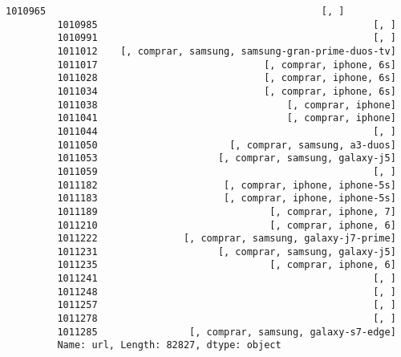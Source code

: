 \documentclass[11pt]{article}
\begin{document}
\begin{Verbatim}[commandchars=\\\{\}]
         1010965                                                [, ]
         1010985                                                [, ]
         1010991                                                [, ]
         1011012    [, comprar, samsung, samsung-gran-prime-duos-tv]
         1011017                             [, comprar, iphone, 6s]
         1011028                             [, comprar, iphone, 6s]
         1011034                             [, comprar, iphone, 6s]
         1011038                                 [, comprar, iphone]
         1011041                                 [, comprar, iphone]
         1011044                                                [, ]
         1011050                       [, comprar, samsung, a3-duos]
         1011053                     [, comprar, samsung, galaxy-j5]
         1011059                                                [, ]
         1011182                      [, comprar, iphone, iphone-5s]
         1011183                      [, comprar, iphone, iphone-5s]
         1011189                              [, comprar, iphone, 7]
         1011210                              [, comprar, iphone, 6]
         1011222               [, comprar, samsung, galaxy-j7-prime]
         1011231                     [, comprar, samsung, galaxy-j5]
         1011235                              [, comprar, iphone, 6]
         1011241                                                [, ]
         1011248                                                [, ]
         1011257                                                [, ]
         1011278                                                [, ]
         1011285                [, comprar, samsung, galaxy-s7-edge]
         Name: url, Length: 82827, dtype: object
\end{Verbatim}
            
\end{document}
